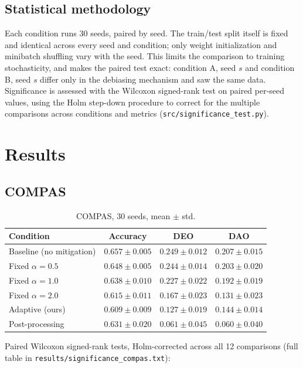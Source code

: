 \documentclass[11pt]{article}
\begin{document}
\subsection{Statistical methodology}
Each condition runs 30 seeds, paired by seed. The train/test split
itself is fixed and identical across every seed and condition; only
weight initialization and minibatch shuffling vary with the seed. This
limits the comparison to training stochasticity, and makes the paired
test exact: condition A, seed $s$ and condition B, seed $s$ differ only
in the debiasing mechanism and saw the same data.
Significance is assessed with the Wilcoxon signed-rank test on paired
per-seed values, using the Holm step-down procedure to correct for the
multiple comparisons across conditions and metrics
(\nolinkurl{src/significance_test.py}).

\section{Results}

\subsection{COMPAS}

\begin{table}[h]
\centering
\begin{tabular}{lccc}
\toprule
Condition & Accuracy & DEO & DAO \\
\midrule
Baseline (no mitigation)   & $0.657 \pm 0.005$ & $0.249 \pm 0.012$ & $0.207 \pm 0.015$ \\
Fixed $\alpha=0.5$         & $0.648 \pm 0.005$ & $0.244 \pm 0.014$ & $0.203 \pm 0.020$ \\
Fixed $\alpha=1.0$         & $0.638 \pm 0.010$ & $0.227 \pm 0.022$ & $0.192 \pm 0.019$ \\
Fixed $\alpha=2.0$         & $0.615 \pm 0.011$ & $0.167 \pm 0.023$ & $0.131 \pm 0.023$ \\
Adaptive (ours)            & $0.609 \pm 0.009$ & $0.127 \pm 0.019$ & $0.144 \pm 0.014$ \\
Post-processing            & $0.631 \pm 0.020$ & $0.061 \pm 0.045$ & $0.060 \pm 0.040$ \\
\bottomrule
\end{tabular}
\caption{COMPAS, 30 seeds, mean $\pm$ std.}
\label{tab:compas}
\end{table}

Paired Wilcoxon signed-rank tests, Holm-corrected across all 12
comparisons (full table in \nolinkurl{results/significance_compas.txt}):
\end{document}
